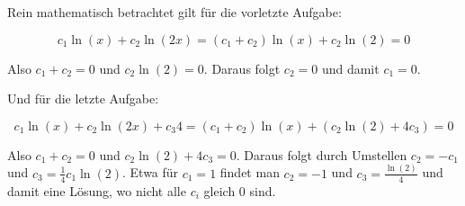 Rein mathematisch betrachtet gilt für die vorletzte Aufgabe:

$$
	c_1 \ln(x) + c_2 \ln(2x) = (c_1+c_2) \ln(x) + c_2 \ln(2) = 0
$$

Also $c_1+c_2=0$ und $c_2\ln(2) = 0$. Daraus folgt $c_2=0$ und damit $c_1=0$.

Und für die letzte Aufgabe:

$$
	c_1 \ln(x) + c_2 \ln(2x) + c_3 4 = (c_1+c_2) \ln(x) + (c_2 \ln(2) + 4c_3) = 0
$$

Also $c_1+c_2=0$ und $c_2\ln(2) + 4c_3 = 0$. Daraus folgt durch Umstellen $c_2=-c_1$ und $c_3=\frac{1}{4} c_1 \ln(2)$. Etwa für $c_1=1$ findet man $c_2=-1$ und $c_3=\frac{\ln(2)}{4}$ und damit eine Lösung, wo nicht alle $c_i$ gleich $0$ sind.
